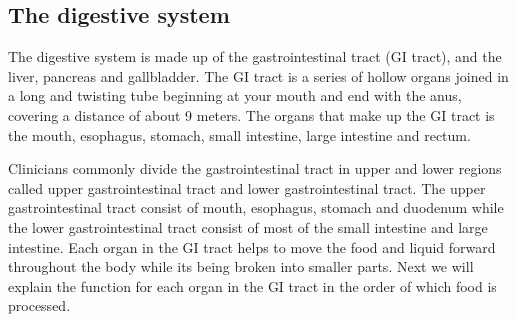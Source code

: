\documentclass[thesis.tex]{subfiles}
\begin{document}
\subsection{The digestive system}  \label{sec:the_digestive_system}

The digestive system is made up of the gastrointestinal tract (GI tract), and the liver, pancreas and gallbladder. The GI tract is a series of hollow organs joined in a long and twisting tube beginning at your mouth and end with the anus, covering a distance of about 9 meters. The organs that make up the GI tract is the mouth, esophagus, stomach, small intestine, large intestine and rectum.

Clinicians commonly divide the gastrointestinal tract in upper and lower regions called upper gastrointestinal tract and lower gastrointestinal tract. The upper gastrointestinal tract consist of mouth, esophagus, stomach and duodenum while the lower gastrointestinal tract consist of most of the small intestine and large intestine. Each organ in the GI tract helps to move the food and liquid forward throughout the body while its being broken into smaller parts. Next we will explain the function for each organ in the GI tract in the order of which food is processed.
\end{document}
